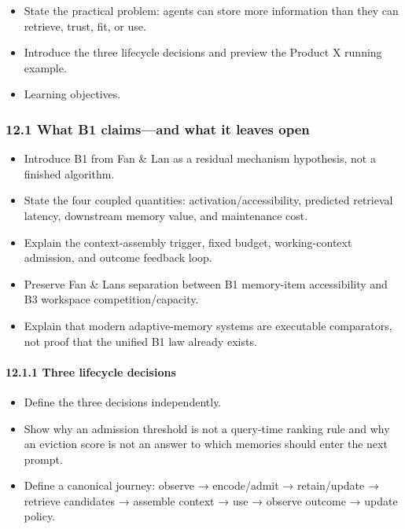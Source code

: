 \begin{itemize}
\tightlist
\item
  State the practical problem: agents can store more information than they can retrieve, trust, fit, or use.
\item
  Introduce the three lifecycle decisions and preview the Product X running example.
\item
  Learning objectives.
\end{itemize}

\subsubsection{12.1 What B1 claims---and what it leaves open}\label{121-what-b1-claimsand-what-it-leaves-open}

\begin{itemize}
\tightlist
\item
  Introduce B1 from Fan \& Lan as a residual mechanism hypothesis, not a finished algorithm.
\item
  State the four coupled quantities: activation/accessibility, predicted retrieval latency, downstream memory value, and maintenance cost.
\item
  Explain the context-assembly trigger, fixed budget, working-context admission, and outcome feedback loop.
\item
  Preserve Fan \& Lan\textquotesingle s separation between B1 memory-item accessibility and B3 workspace competition/capacity.
\item
  Explain that modern adaptive-memory systems are executable comparators, not proof that the unified B1 law already exists.
\end{itemize}

\paragraph{12.1.1 Three lifecycle decisions}\label{1211-three-lifecycle-decisions}

\begin{itemize}
\tightlist
\item
  Define the three decisions independently.
\item
  Show why an admission threshold is not a query-time ranking rule and why an eviction score is not an answer to which memories should enter the next prompt.
\item
  Define a canonical journey: observe → encode/admit → retain/update → retrieve candidates → assemble context → use → observe outcome → update policy.
\end{itemize}

